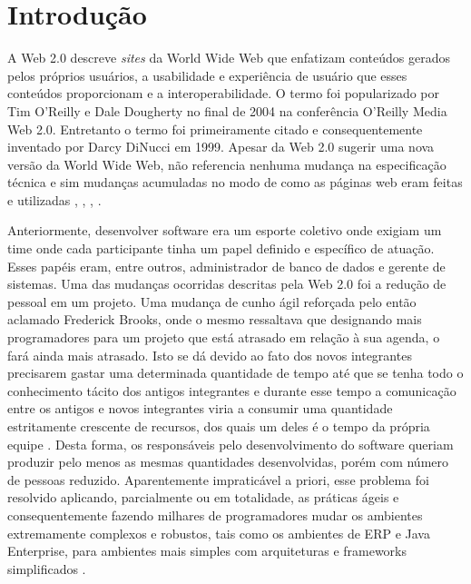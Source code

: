 \chapter{Introdução}

A Web 2.0 descreve \textit{sites} da World Wide Web que enfatizam conteúdos gerados pelos próprios usuários, a usabilidade e experiência de usuário que esses conteúdos proporcionam e a interoperabilidade. O termo foi popularizado por Tim O'Reilly e Dale Dougherty no final de 2004 na conferência O'Reilly Media Web 2.0. Entretanto o termo foi primeiramente citado e consequentemente inventado por Darcy DiNucci em 1999. Apesar da Web 2.0 sugerir uma nova versão da World Wide Web, não referencia nenhuma mudança na especificação técnica e sim mudanças acumuladas no modo de como as páginas web eram feitas e utilizadas \cite{graham2005}, \cite{oreilly2005}, \cite{strickland2007}, \cite{dinucci1999}.

	Anteriormente, desenvolver software era um esporte coletivo onde exigiam um time onde cada participante tinha um papel definido e específico de atuação. Esses papéis eram, entre outros, administrador de banco de dados e gerente de sistemas. Uma das mudanças ocorridas descritas pela Web 2.0 foi a redução de pessoal em um projeto. Uma mudança de cunho ágil reforçada pelo então aclamado Frederick Brooks, onde o mesmo ressaltava que designando mais programadores para um projeto que está atrasado em relação à sua agenda, o fará ainda mais atrasado. Isto se dá devido ao fato dos novos integrantes precisarem gastar uma determinada quantidade de tempo até que se tenha todo o conhecimento tácito dos antigos integrantes e durante esse tempo a comunicação entre os antigos e novos integrantes viria a consumir uma quantidade estritamente crescente de recursos, dos quais um deles é o tempo da própria equipe \cite{Brooks:1995:MM:207583}. Desta forma, os responsáveis pelo desenvolvimento do software queriam produzir pelo menos as mesmas quantidades desenvolvidas, porém com número de pessoas reduzido. Aparentemente impraticável a priori, esse problema foi resolvido aplicando, parcialmente ou em totalidade, as práticas ágeis e consequentemente fazendo milhares de programadores mudar os ambientes extremamente complexos e robustos, tais como os ambientes de ERP e Java Enterprise, para ambientes mais simples com arquiteturas e frameworks simplificados \cite{kent1998}.

